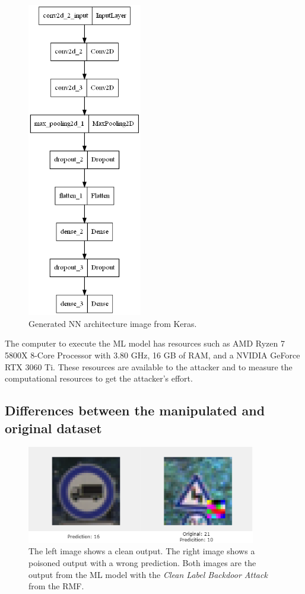 \begin{figure}[h!]
  \centering
  \includegraphics[width=5cm]{pictures/nn.png}
  \caption{Generated NN architecture image from Keras.}
  \label{fig:nn}
\end{figure}

The computer to execute the ML model has resources such as AMD Ryzen \cite{DBLP:conf/hotchips/AroraBW20} 7 5800X 8-Core Processor with 3.80 GHz, 16 GB of RAM, and a NVIDIA GeForce RTX \cite{DBLP:journals/pcs/SanzharovFG20} 3060 Ti. These resources are available to the attacker and to measure the computational resources to get the attacker's effort.

\subsection{Differences between the manipulated and original dataset}

\begin{figure}[ht!]
  \centering
  \includegraphics[width=10cm]{pictures/backdoor_example_rmf.png}
  \caption{The left image shows a clean output. The right image shows a poisoned output with a wrong prediction. Both images are the output from the ML model with the \textit{Clean Label Backdoor Attack} from the RMF.}
  \label{fig:backdoor_example_rmf}
\end{figure}

